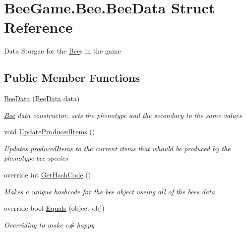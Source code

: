 \hypertarget{struct_bee_game_1_1_bee_1_1_bee_data}{}\section{Bee\+Game.\+Bee.\+Bee\+Data Struct Reference}
\label{struct_bee_game_1_1_bee_1_1_bee_data}


Data Storgae for the \hyperlink{namespace_bee_game_1_1_bee}{Bee}\textquotesingle{}s in the game  


\subsection*{Public Member Functions}
\begin{DoxyCompactItemize}
\item 
\hyperlink{struct_bee_game_1_1_bee_1_1_bee_data_ae105a46ac786f4ba927efeaf4ef02f86}{Bee\+Data} (\hyperlink{struct_bee_game_1_1_bee_1_1_bee_data}{Bee\+Data} data)
\begin{DoxyCompactList}\small\item\em \hyperlink{namespace_bee_game_1_1_bee}{Bee} data constructor, sets the phenotype and the secondary to the same values \end{DoxyCompactList}\item 
void \hyperlink{struct_bee_game_1_1_bee_1_1_bee_data_ae672215675ea4965bd36669043913581}{Update\+Produced\+Items} ()
\begin{DoxyCompactList}\small\item\em Updates \hyperlink{struct_bee_game_1_1_bee_1_1_bee_data_a3c49396295407e1744f501e86c32d61c}{produced\+Items} to the current items that whould be produced by the phenotype bee species \end{DoxyCompactList}\item 
override int \hyperlink{struct_bee_game_1_1_bee_1_1_bee_data_ab11b7e2d244cb0021c52ae0b839ff6c3}{Get\+Hash\+Code} ()
\begin{DoxyCompactList}\small\item\em Makes a unique hashcode for the bee object useing all of the bee\textquotesingle{}s data \end{DoxyCompactList}\item 
override bool \hyperlink{struct_bee_game_1_1_bee_1_1_bee_data_a5909cd9eb6bbe6f7f2ef348e135b6c86}{Equals} (object obj)
\begin{DoxyCompactList}\small\item\em Overriding to make c\# happy \end{DoxyCompactList}\end{DoxyCompactItemize}
